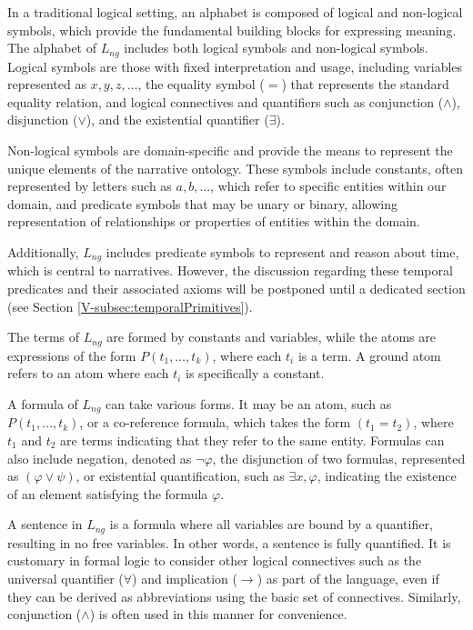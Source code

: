 In a traditional logical setting, an alphabet is composed of logical and non-logical symbols, which provide the fundamental building blocks for expressing meaning. The alphabet of $L_{ng}$ includes both logical symbols and non-logical symbols. Logical symbols are those with fixed interpretation and usage, including variables represented as $x, y, z, \dots$, the equality symbol ($=$) that represents the standard equality relation, and logical connectives and quantifiers such as conjunction ($\land$), disjunction ($\lor$), and the existential quantifier ($\exists$).

Non-logical symbols are domain-specific and provide the means to represent the unique elements of the narrative ontology. These symbols include constants, often represented by letters such as $a, b, \dots$, which refer to specific entities within our domain, and predicate symbols that may be unary or binary, allowing representation of relationships or properties of entities within the domain.

Additionally, $L_{ng}$ includes predicate symbols to represent and reason about time, which is central to narratives. However, the discussion regarding these temporal predicates and their associated axioms will be postponed until a dedicated section (see Section \ref{V-subsec:temporalPrimitives}).

The terms of $L_{ng}$ are formed by constants and variables, while the atoms are expressions of the form $P(t_1, \dots, t_k)$, where each $t_i$ is a term. A ground atom refers to an atom where each $t_i$ is specifically a constant.

A formula of $L_{ng}$ can take various forms. It may be an atom, such as $P(t_1, \dots, t_k)$, or a co-reference formula, which takes the form $(t_1 = t_2)$, where $t_1$ and $t_2$ are terms indicating that they refer to the same entity. Formulas can also include negation, denoted as $\neg \varphi$, the disjunction of two formulas, represented as $(\varphi \lor \psi)$, or existential quantification, such as $\exists x , \varphi$, indicating the existence of an element satisfying the formula $\varphi$.

A sentence in $L_{ng}$ is a formula where all variables are bound by a quantifier, resulting in no free variables. In other words, a sentence is fully quantified. It is customary in formal logic to consider other logical connectives such as the universal quantifier ($\forall$) and implication ($\rightarrow$) as part of the language, even if they can be derived as abbreviations using the basic set of connectives. Similarly, conjunction ($\land$) is often used in this manner for convenience.

